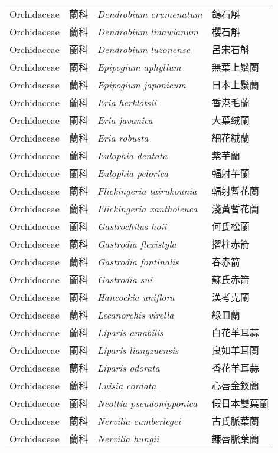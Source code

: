 \begin{longtable}{p{3cm}p{2cm}p{5cm}p{3cm}}
    Orchidaceae & 蘭科 & \textit{Dendrobium crumenatum}  & 鴿石斛\\
    Orchidaceae & 蘭科 & \textit{Dendrobium linawianum}  & 櫻石斛\\
    Orchidaceae & 蘭科 & \textit{Dendrobium luzonense}  & 呂宋石斛\\
    Orchidaceae & 蘭科 & \textit{Epipogium aphyllum}  & 無葉上鬚蘭\\
    Orchidaceae & 蘭科 & \textit{Epipogium japonicum}  & 日本上鬚蘭\\
    Orchidaceae & 蘭科 & \textit{Eria herklotsii}  & 香港毛蘭\\
    Orchidaceae & 蘭科 & \textit{Eria javanica}  & 大葉绒蘭\\
    Orchidaceae & 蘭科 & \textit{Eria robusta}  & 細花絨蘭\\
    Orchidaceae & 蘭科 & \textit{Eulophia dentata}  & 紫芋蘭\\
    Orchidaceae & 蘭科 & \textit{Eulophia pelorica}  & 輻射芋蘭\\
    Orchidaceae & 蘭科 & \textit{Flickingeria tairukounia}  & 輻射暫花蘭\\
    Orchidaceae & 蘭科 & \textit{Flickingeria xantholeuca}  & 淺黃暫花蘭\\
    Orchidaceae & 蘭科 & \textit{Gastrochilus hoii}  & 何氏松蘭\\
    Orchidaceae & 蘭科 & \textit{Gastrodia flexistyla}  & 摺柱赤箭\\
    Orchidaceae & 蘭科 & \textit{Gastrodia fontinalis}  & 春赤箭\\
    Orchidaceae & 蘭科 & \textit{Gastrodia sui}  & 蘇氏赤箭\\
    Orchidaceae & 蘭科 & \textit{Hancockia uniflora}  & 漢考克蘭\\
    Orchidaceae & 蘭科 & \textit{Lecanorchis virella}  & 綠皿蘭\\
    Orchidaceae & 蘭科 & \textit{Liparis amabilis}  & 白花羊耳蒜\\
    Orchidaceae & 蘭科 & \textit{Liparis liangzuensis}  & 良如羊耳蘭\\
    Orchidaceae & 蘭科 & \textit{Liparis odorata}  & 香花羊耳蒜\\
    Orchidaceae & 蘭科 & \textit{Luisia cordata}  & 心唇金釵蘭\\
    Orchidaceae & 蘭科 & \textit{Neottia pseudonipponica}  & 假日本雙葉蘭\\
    Orchidaceae & 蘭科 & \textit{Nervilia cumberlegei}  & 古氏脈葉蘭\\
    Orchidaceae & 蘭科 & \textit{Nervilia hungii}  & 鐮唇脈葉蘭\\

\end{longtable}
